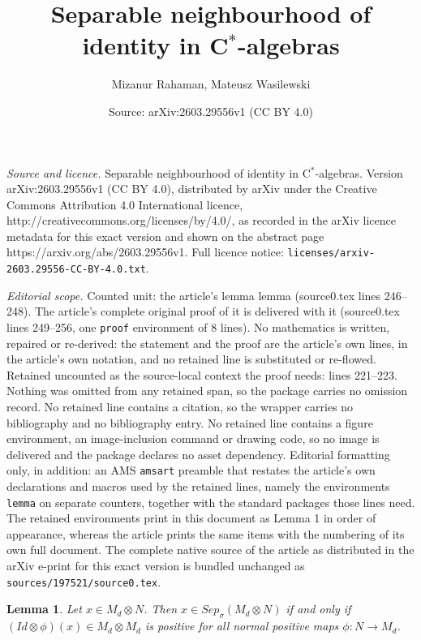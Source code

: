 \documentclass[10pt,a4paper]{amsart}
\title{Separable neighbourhood of identity in C$^*$-algebras}
\author{Mizanur Rahaman, Mateusz Wasilewski}
\date{Source: arXiv:2603.29556v1 (CC BY 4.0)}
\newtheorem{lemma}{Lemma}
\begin{document}
\maketitle

\noindent\emph{Source and licence.} Separable neighbourhood of identity in C$^*$-algebras. Version arXiv:2603.29556v1 (CC BY 4.0), distributed by arXiv under the Creative Commons Attribution 4.0 International licence, http://creativecommons.org/licenses/by/4.0/, as recorded in the arXiv licence metadata for this exact version and shown on the abstract page https://arxiv.org/abs/2603.29556v1. Full licence notice: \texttt{licenses/arxiv-2603.29556-CC-BY-4.0.txt}.\par\smallskip

\noindent\textit{Editorial scope.} Counted unit: the article's lemma lemma (source0.tex lines 246--248). The article's complete original proof of it is delivered with it (source0.tex lines 249--256, one \texttt{proof} environment of 8 lines). No mathematics is written, repaired or re-derived: the statement and the proof are the article's own lines, in the article's own notation, and no retained line is substituted or re-flowed.  Retained uncounted as the source-local context the proof needs: lines 221--223.  Nothing was omitted from any retained span, so the package carries no omission record.  No retained line contains a citation, so the wrapper carries no bibliography and no bibliography entry.  No retained line contains a figure environment, an image-inclusion command or drawing code, so no image is delivered and the package declares no asset dependency.  Editorial formatting only, in addition: an AMS \texttt{amsart} preamble that restates the article's own declarations and macros used by the retained lines, namely the environments \texttt{lemma} on separate counters, together with the standard packages those lines need.  The retained environments print in this document as Lemma 1 in order of appearance, whereas the article prints the same items with the numbering of its own full document.  The complete native source of the article as distributed in the arXiv e-print for this exact version is bundled unchanged as \texttt{sources/197521/source0.tex}.
\begin{lemma}\label{lem:findimhorodecki}
Let $x \in M_d \otimes N$. Then $x\in Sep_{\sigma}(M_d\otimes N)$ if and only if $(Id\otimes \phi)(x) \in M_d\otimes M_d$ is positive for all normal positive maps $\phi: N \to M_d$. 
\end{lemma}
\end{document}
